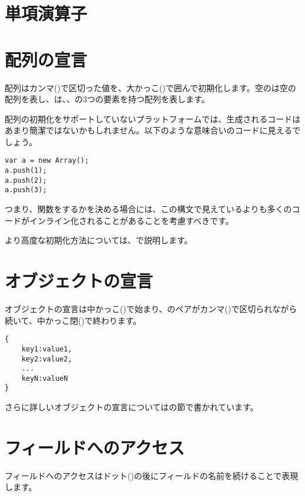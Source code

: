 \section{単項演算子}
\label{expression-unops}

\section{配列の宣言}
\label{expression-array-declaration}

配列はカンマ(\expr{,})で区切った値を、大かっこ(\expr{[]})で囲んで初期化します。空の\expr{[]}は空の配列を表し、\expr{[1, 2, 3]}は、、の3つの要素を持つ配列を表します。

配列の初期化をサポートしていないプラットフォームでは、生成されるコードはあまり簡潔ではないかもしれません。以下のような意味合いのコードに見えるでしょう。

\begin{lstlisting}
var a = new Array();
a.push(1);
a.push(2);
a.push(3);
\end{lstlisting}

つまり、関数をするかを決める場合には、この構文で見えているよりも多くのコードがインライン化されることがあることを考慮すべきです。

より高度な初期化方法については、で説明します。

\section{オブジェクトの宣言}
\label{expression-object-declaration}

オブジェクトの宣言は中かっこ(\expr{\{})で始まり、のペアがカンマ(\expr{,})で区切られながら続いて、中かっこ閉(\expr{\}})で終わります。

\begin{lstlisting}
{
	key1:value1,
	key2:value2,
	...
	keyN:valueN
}
\end{lstlisting}
さらに詳しいオブジェクトの宣言についてはの節で書かれています。

\section{フィールドへのアクセス}
\label{expression-field-access}

フィールドへのアクセスはドット()の後にフィールドの名前を続けることで表現します。

